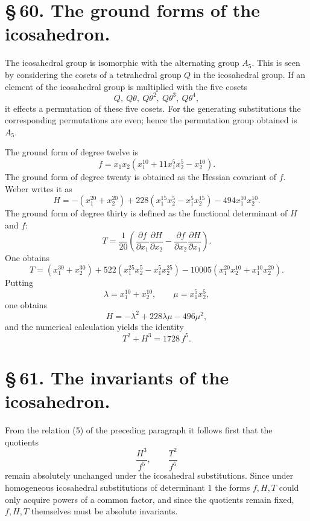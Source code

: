 \documentclass[11pt]{article}
\begin{document}
\section*{\S\,60. The ground forms of the icosahedron.}

The icosahedral group is isomorphic with the alternating group $A_5$. This is seen by considering the cosets of a tetrahedral group $Q$ in the icosahedral group. If an element of the icosahedral group is multiplied with the five cosets
\[
 Q,\ Q\theta,\ Q\theta^2,\ Q\theta^3,\ Q\theta^4,
\]
it effects a permutation of these five cosets. For the generating substitutions the corresponding permutations are even; hence the permutation group obtained is $A_5$.

The ground form of degree twelve is
\begin{equation}
 f=x_1x_2(x_1^{10}+11x_1^5x_2^5-x_2^{10}).
\tag{1}
\end{equation}
The ground form of degree twenty is obtained as the Hessian covariant of $f$. Weber writes it as
\begin{equation}
 H=-(x_1^{20}+x_2^{20})
    +228(x_1^{15}x_2^5-x_1^5x_2^{15})
    -494x_1^{10}x_2^{10}.
\tag{2}
\end{equation}
The ground form of degree thirty is defined as the functional determinant of $H$ and $f$:
\begin{equation}
 T=\frac1{20}\left(
 \frac{\partial f}{\partial x_1}\frac{\partial H}{\partial x_2}
-\frac{\partial f}{\partial x_2}\frac{\partial H}{\partial x_1}\right).
\tag{3}
\end{equation}
One obtains
\begin{equation}
 T=(x_1^{30}+x_2^{30})
 +522(x_1^{25}x_2^5-x_1^5x_2^{25})
 -10005(x_1^{20}x_2^{10}+x_1^{10}x_2^{20}).
\tag{4}
\end{equation}
Putting
\[
 \lambda=x_1^{10}+x_2^{10},\qquad \mu=x_1^5x_2^5,
\]
one obtains
\[
 H=-\lambda^2+228\lambda\mu-496\mu^2,
\]
and the numerical calculation yields the identity
\begin{equation}
 T^2+H^3=1728\,f^5.
\tag{5}
\end{equation}

\section*{\S\,61. The invariants of the icosahedron.}

From the relation (5) of the preceding paragraph it follows first that the quotients
\[
 \frac{H^3}{f^5},\qquad \frac{T^2}{f^5}
\]
remain absolutely unchanged under the icosahedral substitutions. Since under homogeneous icosahedral substitutions of determinant $1$ the forms $f,H,T$ could only acquire powers of a common factor, and since the quotients remain fixed, $f,H,T$ themselves must be absolute invariants.
\end{document}
